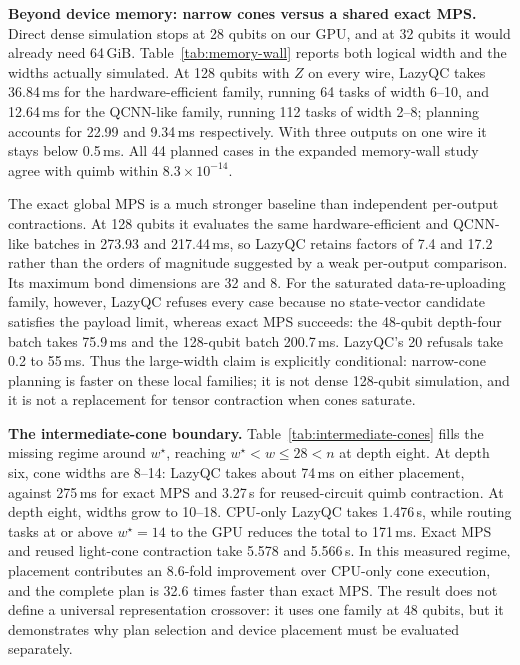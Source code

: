 \textbf{Beyond device memory: narrow cones versus a shared exact MPS.} Direct dense simulation stops at 28 qubits on our GPU, and at 32 qubits it would already need 64\,GiB. Table~\ref{tab:memory-wall} reports both logical width and the widths actually simulated. At 128 qubits with $Z$ on every wire, LazyQC takes 36.84\,ms for the hardware-efficient family, running 64 tasks of width 6--10, and 12.64\,ms for the QCNN-like family, running 112 tasks of width 2--8; planning accounts for 22.99 and 9.34\,ms respectively. With three outputs on one wire it stays below 0.5\,ms. All 44 planned cases in the expanded memory-wall study agree with quimb within $8.3\times10^{-14}$.

The exact global MPS is a much stronger baseline than independent per-output contractions. At 128 qubits it evaluates the same hardware-efficient and QCNN-like batches in 273.93 and 217.44\,ms, so LazyQC retains factors of 7.4 and 17.2 rather than the orders of magnitude suggested by a weak per-output comparison. Its maximum bond dimensions are 32 and 8. For the saturated data-re-uploading family, however, LazyQC refuses every case because no state-vector candidate satisfies the payload limit, whereas exact MPS succeeds: the 48-qubit depth-four batch takes 75.9\,ms and the 128-qubit batch 200.7\,ms. LazyQC's 20 refusals take 0.2 to 55\,ms. Thus the large-width claim is explicitly conditional: narrow-cone planning is faster on these local families; it is not dense 128-qubit simulation, and it is not a replacement for tensor contraction when cones saturate.

\begin{table}[!t]
\caption{Intermediate-Cone Hardware-Efficient Batches at 48 Logical Qubits, with $Z$ on Every Wire. All Entries Include Preparation or Planning and Every Output. The 24 Cone Tasks Have the Width Ranges Shown; a Full 48-Qubit Dense State Does Not Fit on the GPU. Times Are Geometric Means over Two Seeds, in Seconds.}
\label{tab:intermediate-cones}
\centering
\setlength{\tabcolsep}{3pt}
\footnotesize
\resizebox{\columnwidth}{!}{}
\end{table}

\textbf{The intermediate-cone boundary.} Table~\ref{tab:intermediate-cones} fills the missing regime around $w^\star$, reaching $w^\star<w\le28<n$ at depth eight. At depth six, cone widths are 8--14: LazyQC takes about 74\,ms on either placement, against 275\,ms for exact MPS and 3.27\,s for reused-circuit quimb contraction. At depth eight, widths grow to 10--18. CPU-only LazyQC takes 1.476\,s, while routing tasks at or above $w^\star=14$ to the GPU reduces the total to 171\,ms. Exact MPS and reused light-cone contraction take 5.578 and 5.566\,s. In this measured regime, placement contributes an 8.6-fold improvement over CPU-only cone execution, and the complete plan is 32.6 times faster than exact MPS. The result does not define a universal representation crossover: it uses one family at 48 qubits, but it demonstrates why plan selection and device placement must be evaluated separately.
